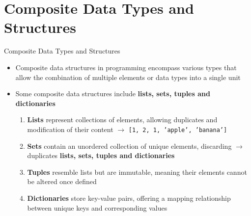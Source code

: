 \documentclass[
	11pt, 
]{beamer}
\begin{document}
\section{Composite Data Types and Structures}

\begin{frame}[fragile]{Composite Data Types and Structures}

\begin{itemize}

\item Composite data structures in programming encompass various types that allow the combination of multiple elements or data types into a single unit


\item Some composite data structures include \textbf{lists, sets, tuples and dictionaries} 
\smallskip

\begin{enumerate}
    \item \textbf{Lists} represent collections of elements, allowing duplicates and modification of their content $\rightarrow$ \texttt{[1, 2, 1, 'apple', 'banana']}\smallskip
    \item \textbf{Sets} contain an unordered collection of unique elements, discarding  $\rightarrow$ duplicates \textbf{lists, sets, tuples and dictionaries} \smallskip
    \item \textbf{Tuples} resemble lists but are immutable, meaning their elements cannot be altered once defined \smallskip
    \item \textbf{Dictionaries} store key-value pairs, offering a mapping relationship between unique keys and corresponding values
\end{enumerate}

\end{itemize}
\end{frame}

\end{document}
